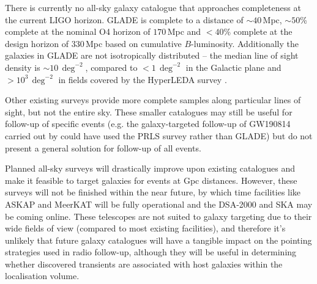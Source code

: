 There is currently no all-sky galaxy catalogue that approaches completeness at the current LIGO horizon. GLADE \citep{2018MNRAS.479.2374D} is complete to a distance of $\sim 40\,$Mpc, $\sim 50$\% complete at the nominal O4 horizon of $170\,$Mpc and $<40$\% complete at the design horizon of 330\,Mpc based on cumulative $B$-luminosity. Additionally the galaxies in GLADE are not isotropically distributed -- the median line of sight density is $\sim 10\,\deg^{-2}$, compared to $< 1\,\deg^{-2}$ in the Galactic plane and $>10^{3}\,\deg^{-2}$ in fields covered by the HyperLEDA survey \citep{2014A&A...570A..13M}.

Other existing surveys provide more complete samples along particular lines of sight, but not the entire sky. These smaller catalogues may still be useful for follow-up of specific events (e.g. the galaxy-targeted follow-up of GW190814 carried out by \citet{2019ApJ...884L..55G,2020arXiv200201950A} could have used the PRLS survey rather than GLADE) but do not present a general solution for follow-up of all events.

Planned all-sky surveys \citep[e.g.][among others]{2009arXiv0912.0201L,2016arXiv160607039D} will drastically improve upon existing catalogues and make it feasible to target galaxies for events at Gpc distances. However, these surveys will not be finished within the near future, by which time facilities like ASKAP and MeerKAT will be fully operational and the DSA-2000 and SKA may be coming online. These telescopes are not suited to galaxy targeting due to their wide fields of view (compared to most existing facilities), and therefore it's unlikely that future galaxy catalogues will have a tangible impact on the pointing strategies used in radio follow-up, although they will be useful in determining whether discovered transients are associated with host galaxies within the localisation volume.




